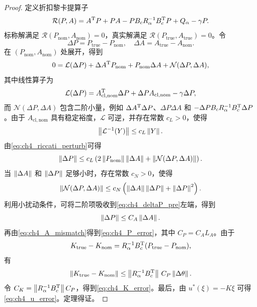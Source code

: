 \begin{proof}
定义折扣黎卡提算子
\begin{equation}
  \mathcal{R}(P,A)=A^{\mathrm{T}}P+PA-PB_cR_\alpha^{-1}B_c^{\mathrm{T}}P+Q_\alpha-\gamma P .
\end{equation}
标称解满足 $\mathcal{R}(P_{\mathrm{nom}},A_{\mathrm{nom}})=0$，真实解满足 $\mathcal{R}(P_{\mathrm{true}},A_{\mathrm{true}})=0$。令
\begin{equation}
  \Delta P=P_{\mathrm{true}}-P_{\mathrm{nom}},
  \quad \Delta A=A_{\mathrm{true}}-A_{\mathrm{nom}} .
\end{equation}
在 $(P_{\mathrm{nom}},A_{\mathrm{nom}})$ 处展开，得到
\begin{equation}
  0=\mathcal{L}(\Delta P)+\Delta A^{\mathrm{T}}P_{\mathrm{nom}}+P_{\mathrm{nom}}\Delta A+\mathcal{N}(\Delta P,\Delta A),
  \label{eq:ch4_riccati_perturb}
\end{equation}
其中线性算子为
\begin{equation}
  \mathcal{L}(\Delta P)=A_{\mathrm{cl,nom}}^{\mathrm{T}}\Delta P+\Delta P A_{\mathrm{cl,nom}}-\gamma\Delta P,
\end{equation}
而 $\mathcal{N}(\Delta P,\Delta A)$ 包含二阶小量，例如 $\Delta A^{\mathrm{T}}\Delta P$、$\Delta P\Delta A$ 和 $-\Delta P B_cR_\alpha^{-1}B_c^{\mathrm{T}}\Delta P$。由于 $A_{\mathrm{cl,nom}}$ 具有稳定裕度，$\mathcal{L}$ 可逆，并存在常数 $c_L>0$，使得
\begin{equation}
  \left\lVert \mathcal{L}^{-1}(Y)\right\rVert\le c_L\left\lVert Y\right\rVert .
\end{equation}
由\eqref{eq:ch4_riccati_perturb}可得
\begin{equation}
  \left\lVert \Delta P\right\rVert\le c_L\left(2\left\lVert P_{\mathrm{nom}}\right\rVert\left\lVert \Delta A\right\rVert+\left\lVert \mathcal{N}(\Delta P,\Delta A)\right\rVert\right).
  \label{eq:ch4_deltaP_pre}
\end{equation}
当 $\left\lVert \Delta A\right\rVert$ 和 $\left\lVert \Delta P\right\rVert$ 足够小时，存在常数 $c_N>0$，使得
\begin{equation}
  \left\lVert \mathcal{N}(\Delta P,\Delta A)\right\rVert\le c_N\left(\left\lVert \Delta A\right\rVert\left\lVert \Delta P\right\rVert+\left\lVert \Delta P\right\rVert^2\right).
\end{equation}
利用小扰动条件，可将二阶项吸收到\eqref{eq:ch4_deltaP_pre}左端，得到
\begin{equation}
  \left\lVert \Delta P\right\rVert\le C_A\left\lVert \Delta A\right\rVert .
\end{equation}
再由\eqref{eq:ch4_A_mismatch}得到\eqref{eq:ch4_P_error}，其中 $C_P=C_A L_A$。由于
\begin{equation}
  K_{\mathrm{true}}-K_{\mathrm{nom}}=R_\alpha^{-1}B_c^{\mathrm{T}}(P_{\mathrm{true}}-P_{\mathrm{nom}}),
\end{equation}
有
\begin{equation}
  \left\lVert K_{\mathrm{true}}-K_{\mathrm{nom}}\right\rVert\le \left\lVert R_\alpha^{-1}B_c^{\mathrm{T}}\right\rVert\,C_P\left\lVert \Delta\theta\right\rVert .
\end{equation}
令 $C_K=\left\lVert R_\alpha^{-1}B_c^{\mathrm{T}}\right\rVert C_P$，得到\eqref{eq:ch4_K_error}。最后，由 $u^*(\xi)=-K\xi$ 可得\eqref{eq:ch4_u_error}。定理得证。
\end{proof}

